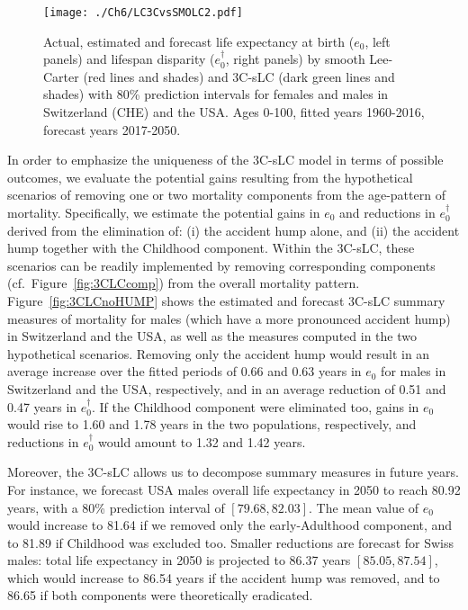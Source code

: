 \documentclass[Thesis]{subfiles}
\begin{document}
\begin{figure}[!ht]\centering
	\texttt{[image: ./Ch6/LC3CvsSMOLC2.pdf]}
	\caption{\label{fig:3CLCvsLCsmo} Actual, estimated and forecast life expectancy at birth ($e_0$, left panels) and lifespan disparity ($e^{\dagger}_0$, right panels) by smooth Lee-Carter (red lines and shades) and 3C-sLC (dark green lines and shades) with 80\% prediction intervals for females and males in Switzerland (CHE) and the USA. Ages 0-100, fitted years 1960-2016, forecast years 2017-2050.}  
\end{figure}

In order to emphasize the uniqueness of the 3C-sLC model in terms of possible outcomes, we evaluate the potential gains resulting from the hypothetical scenarios of removing one or two mortality components from the age-pattern of mortality. Specifically, we estimate the potential gains in $e_0$ and reductions in $e^{\dagger}_0$ derived from the elimination of: (i) the accident hump alone, and (ii) the accident hump together with the Childhood component. Within the 3C-sLC, these scenarios can be readily implemented by removing corresponding components (cf.~Figure~\ref{fig:3CLCcomp}) from the overall mortality pattern. Figure~\ref{fig:3CLCnoHUMP} shows the estimated and forecast 3C-sLC summary measures of mortality for males (which have a more pronounced accident hump) in Switzerland and the USA, as well as the measures computed in the two hypothetical scenarios. Removing only the accident hump would result in an average increase over the fitted periods of 0.66 and 0.63 years in $e_0$ for males in Switzerland and the USA, respectively, and in an average reduction of 0.51 and 0.47 years in $e^{\dagger}_0$. If the Childhood component were eliminated too, gains in $e_0$ would rise to 1.60 and 1.78 years in the two populations, respectively, and reductions in $e^{\dagger}_0$ would amount to 1.32 and 1.42 years. 

Moreover, the 3C-sLC allows us to decompose summary measures in future years. For instance, we forecast USA males overall life expectancy in 2050 to reach 80.92 years, with a 80\% prediction interval of $[79.68,82.03]$. The mean value of $e_0$ would increase to 81.64 if we removed only the early-Adulthood component, and to 81.89 if Childhood was excluded too. Smaller reductions are forecast for Swiss males: total life expectancy in 2050 is projected to 86.37 years $[85.05, 87.54]$, which would increase to 86.54 years if the accident hump was removed, and to 86.65 if both components were theoretically eradicated.   
\end{document}
